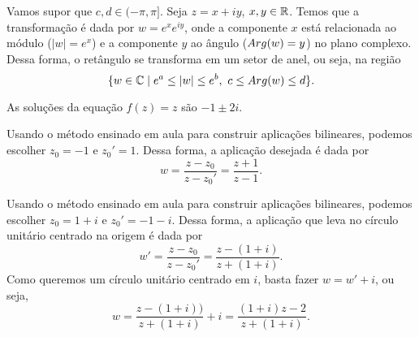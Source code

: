
\begin{questions}

\setcounter{question}{3}
%
\begin{solution}
    Vamos supor que $c,d\in(-\pi,\pi]$.
    Seja $z = x+iy$, $x,y\in{\mathbb R}$. Temos que a transformação é dada por $w = e^x e^{iy}$, onde a componente $x$ está relacionada ao módulo ($|w|=e^x$) e a componente $y$ ao ângulo ($\mathop{Arg}(w) = y$) no plano complexo. Dessa forma, o retângulo se transforma em um setor de anel, ou seja, na região $$\{w\in{\mathbb C} \mid e^a \le |w| \le e^b,~ c \le \mathop{Arg}(w) \le d \}.$$
\end{solution}

\setcounter{question}{5}
%
\begin{solution}
    As soluções da equação $f(z)=z$ são $-1\pm2i$.
\end{solution}

\setcounter{question}{7}
%
\begin{solution}
    Usando o método ensinado em aula para construir aplicações bilineares, podemos escolher $z_0 = -1$ e $z_0' = 1$. Dessa forma, a aplicação desejada é dada por
    \[
        w = \frac{z-z_0}{z-z_0'} = \frac{z+1}{z-1}.
    \]
\end{solution}


%
\begin{solution}
    Usando o método ensinado em aula para construir aplicações bilineares, podemos escolher $z_0 = 1+i$ e $z_0' = -1-i$. Dessa forma, a aplicação que leva no círculo unitário centrado na origem é dada por
    \[
        w' = \frac{z-z_0}{z-z_0'} = \frac{z-(1+i)}{z+(1+i)}.
    \]
    Como queremos um círculo unitário centrado em $i$, basta fazer $w=w'+i$, ou seja,
    \[
        w = \frac{z-(1+i))}{z+(1+i)}+i = \frac{(1+i)z-2}{z+(1+i)}.
    \]
\end{solution}

\end{questions}
